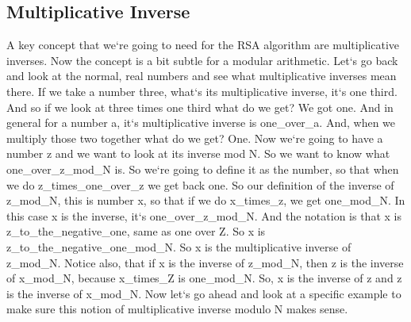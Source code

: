 \subsection{Multiplicative Inverse}
A key concept that we`re going to need for the RSA algorithm are multiplicative inverses.
Now the concept is a bit subtle for a modular arithmetic.
Let`s go back and look at the normal, real numbers and see what multiplicative inverses mean there.
If we take a number three, what`s its multiplicative inverse, it`s one third.
And so if we look at three times one third what do we get? We got one.
And in general for a number a, it`s multiplicative inverse is one\_over\_a.
And, when we multiply those two together what do we get? One.
Now we`re going to have a number z and we want to look at its inverse mod N\@.
So we want to know what one\_over\_z\_mod\_N is.
So we`re going to define it as the number, so that when we do z\_times\_one\_over\_z we get back one.
So our definition of the inverse of z\_mod\_N, this is number x, so that if we do x\_times\_z, we get one\_mod\_N\@.
In this case x is the inverse, it`s one\_over\_z\_mod\_N\@.
And the notation is that x is z\_to\_the\_negative\_one, same as one over Z\@.
So x is z\_to\_the\_negative\_one\_mod\_N\@.
So x is the multiplicative inverse of z\_mod\_N\@.
Notice also, that if x is the inverse of z\_mod\_N, then z is the inverse of x\_mod\_N, because x\_times\_Z is one\_mod\_N\@.
So, x is the inverse of z and z is the inverse of x\_mod\_N\@.
Now let`s go ahead and look at a specific example to make sure this notion of multiplicative inverse modulo N makes sense.

